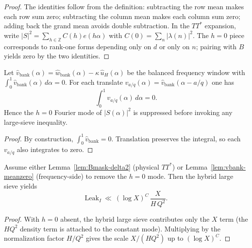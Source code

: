 \begin{proof}
The identities follow from the definition: subtracting the row mean makes each row sum zero; subtracting the column mean makes each column sum zero; adding back the grand mean avoids double subtraction. In the $TT^{\!*}$ expansion, write $|S|^2=\sum_{h\in\mathbb Z}C(h)e(h\alpha)$ with $C(0)=\sum_n|\lambda(n)|^2$. The $h=0$ piece corresponds to rank-one forms depending only on $d$ or only on $n$; pairing with $B$ yields zero by the two identities.
\end{proof}

\begin{lemma}\label{lem:vbank-meanzero}
Let $\widehat v_{\mathrm{bank}}(\alpha)=\widehat w_{\mathrm{bank}}(\alpha)-\kappa\,\widehat u_H(\alpha)$ be the balanced frequency window with $\displaystyle \int_{0}^{1}\widehat v_{\mathrm{bank}}(\alpha)\,d\alpha=0$. For each translate $v_{a/q}(\alpha)=\widehat v_{\mathrm{bank}}(\alpha-a/q)$ one has
\[
\int_{0}^{1} v_{a/q}(\alpha)\,d\alpha = 0.
\]
Hence the $h=0$ Fourier mode of $|S(\alpha)|^2$ is suppressed before invoking any large-sieve inequality.
\end{lemma}

\begin{proof}
By construction, $\int_{0}^{1}\widehat v_{\mathrm{bank}}=0$. Translation preserves the integral, so each $v_{a/q}$ also integrates to zero.
\end{proof}

\begin{proposition}\label{prop:alias-typeI}
Assume either Lemma~\ref{lem:Bmask-delta2} (physical $TT^{\!*}$) or Lemma~\ref{lem:vbank-meanzero} (frequency-side) to remove the $h=0$ mode. Then the hybrid large sieve yields
\[
\mathrm{Leak}_I\ \ll\ (\log X)^C\,\frac{X}{H\,Q^2}.
\]
\end{proposition}

\begin{proof}
With $h=0$ absent, the hybrid large sieve contributes only the $X$ term (the $HQ^2$ density term is attached to the constant mode). Multiplying by the normalization factor $H/Q^2$ gives the scale $X/(H Q^2)$ up to $(\log X)^C$.
\end{proof}


